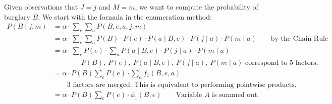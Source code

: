 \documentclass[10pt,UTF8]{article}
\theoremstyle{definition}
\newtheorem{definition inner}{Definition}[section]
\theoremstyle{definition}
\newtheorem{theorem inner}{Theorem}[section]
\theoremstyle{definition}
\newtheorem*{proof inner}{\textit{Proof}}
\theoremstyle{plain}
\newtheorem{tip inner}{Tip}[section]
\theoremstyle{remark}
\begin{document}
\begin{center}
\end{center}

Given observations that \(J=j\) and \(M=m\),
we want to compute the probability of burglary \(B\).
We start with the formula in the enumeration method:
\begin{align*}
  P(B \mid j, m)
  & = \alpha \cdot \sum_{e} \sum_{a}
  P(B, e, a, j, m) \\
  & = \alpha \cdot \sum_{e} \sum_{a}
  P(B) \cdot P(e) \cdot P(a \mid B, e) \cdot
  P(j \mid a) \cdot P(m \mid a)
  \qquad\text{by the Chain Rule} \\
  & = \alpha \cdot \sum_{e}
  P(e) \cdot \sum_{a}
  P(a \mid B, e) \cdot P(j \mid a) \cdot P(m \mid a) \\
  &\qquad\qquad P(B),\ P(e),\ P(a \mid B, e),\
  P(j \mid a),\ P(m \mid a) \text{ correspond to \(5\) factors.}\\
  & = \alpha \cdot P(B) \sum_{e}
  P(e) \cdot \sum_{a} f_1(B, e, a) \\
  &\qquad\text{\(3\) factors are merged. This is equivalent to
  performing pointwise products.} \\
  & = \alpha \cdot P(B) \sum_{e}
  P(e) \cdot \phi_1(B, e)
  \qquad\text{Variable \(A\) is summed out.}
\end{align*}
\end{document}
